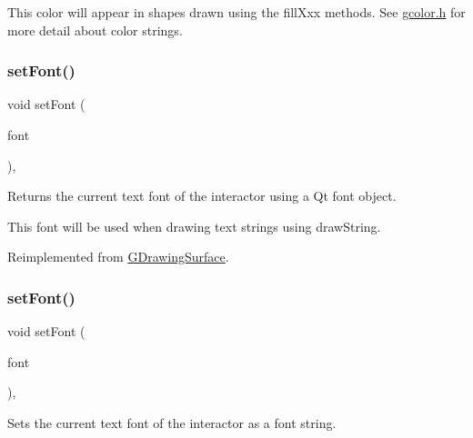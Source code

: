 This color will appear in shapes drawn using the fill\+Xxx methods. See \mbox{\hyperlink{gcolor_8h_source}{gcolor.\+h}} for more detail about color strings. \mbox{\label{classsgl_1_1GCanvas_ad1d75b3840a41ba7d1e8a921696dc684}} 
\subsubsection{\texorpdfstring{set\+Font()}{setFont()}\hspace{0.1cm}{\footnotesize\ttfamily [1/2]}}
{\footnotesize\ttfamily void set\+Font (\begin{DoxyParamCaption}\item[{const Q\+Font \&}]{font }\end{DoxyParamCaption})\hspace{0.3cm}{\ttfamily [override]}, {\ttfamily [virtual]}}



Returns the current text font of the interactor using a Qt font object. 

This font will be used when drawing text strings using draw\+String. 

Reimplemented from \mbox{\hyperlink{classsgl_1_1GDrawingSurface}{G\+Drawing\+Surface}}.

\mbox{\label{classsgl_1_1GCanvas_a51367c9fd2709973b1f7238734f93891}} 
\subsubsection{\texorpdfstring{set\+Font()}{setFont()}\hspace{0.1cm}{\footnotesize\ttfamily [2/2]}}
{\footnotesize\ttfamily void set\+Font (\begin{DoxyParamCaption}\item[{const std\+::string \&}]{font }\end{DoxyParamCaption})\hspace{0.3cm}{\ttfamily [override]}, {\ttfamily [virtual]}}



Sets the current text font of the interactor as a font string. 


